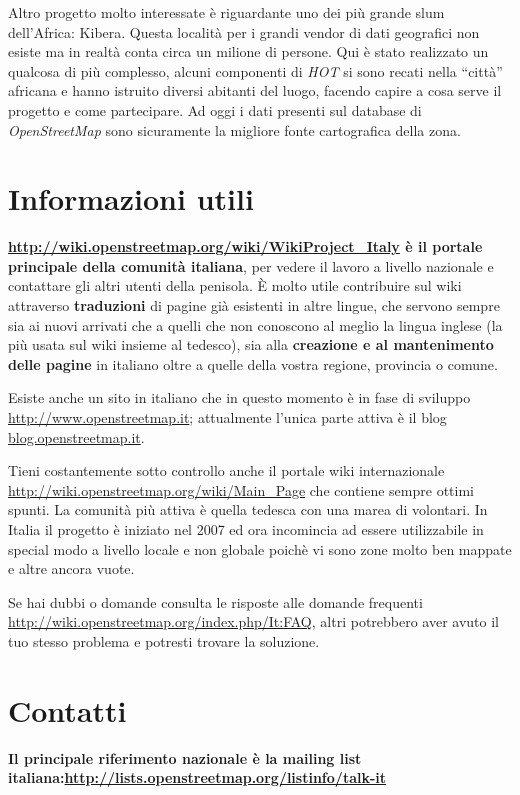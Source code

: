 \documentclass[a4paper,twoside,12pt,]{article}
\newcommand{\osm}{\emph{OpenStreetMap}\xspace}
\newcommand{\pro}[1]{\emph{#1}}
\begin{document}
Altro progetto molto interessate è riguardante uno dei più grande slum dell'Africa: Kibera.
Questa località per i grandi vendor di dati geografici non esiste ma in realtà conta circa un milione di persone. Qui è stato realizzato un qualcosa di più complesso, alcuni componenti di \pro{HOT} si sono recati nella ``città'' africana e hanno istruito diversi abitanti del luogo, facendo capire a cosa serve il progetto e come partecipare. Ad oggi i dati presenti sul database di \osm sono sicuramente la migliore fonte cartografica della zona.
\section{Informazioni utili}
\textbf{\url{http://wiki.openstreetmap.org/wiki/WikiProject_Italy} è il portale principale della comunità italiana}, per vedere il lavoro a livello nazionale e contattare gli altri utenti della penisola. È molto utile contribuire sul wiki attraverso \textbf{traduzioni} di pagine già esistenti in altre lingue, che servono sempre sia ai nuovi arrivati che a quelli che non conoscono al meglio la lingua inglese (la più usata sul wiki insieme al tedesco), sia alla \textbf{creazione e al mantenimento delle pagine} in italiano oltre a quelle della vostra regione, provincia o comune.

Esiste anche un sito in italiano che in questo momento è in fase di sviluppo \url{http://www.openstreetmap.it}; attualmente l'unica parte attiva è il blog \url{blog.openstreetmap.it}.

Tieni costantemente sotto controllo anche il portale wiki internazionale \url{http://wiki.openstreetmap.org/wiki/Main_Page} che contiene sempre ottimi spunti.  La comunità più attiva è quella tedesca con una marea di volontari. In Italia il progetto è iniziato nel 2007 ed ora incomincia ad essere utilizzabile in special modo a livello locale e non globale poichè vi sono zone molto ben mappate e altre ancora vuote.

Se hai dubbi o domande consulta le risposte alle domande frequenti \url{http://wiki.openstreetmap.org/index.php/It:FAQ}, altri potrebbero aver avuto il tuo stesso problema e potresti trovare la soluzione.
\section{Contatti}
\textbf{Il principale riferimento nazionale è la mailing list italiana:\newline \url{http://lists.openstreetmap.org/listinfo/talk-it}}
\end{document}
